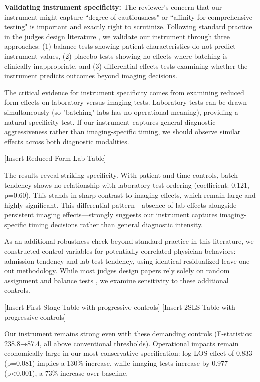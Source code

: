 \documentclass[11pt]{article}
\newcommand{\1}{\hbox{\rm 1\kern-.35em 1}}
\begin{document}
{\textbf{Validating instrument specificity:} The reviewer's concern that our instrument might capture ``degree of cautiousness" or ``affinity for comprehensive testing" is important and exactly right to scrutinize. Following standard practice in the judges design literature \cite{dobbie2018effects, bhuller2020incarceration}, we validate our instrument through three approaches: (1) balance tests showing patient characteristics do not predict instrument values, (2) placebo tests showing no effects where batching is clinically inappropriate, and (3) differential effects tests examining whether the instrument predicts outcomes beyond imaging decisions.

The critical evidence for instrument specificity comes from examining reduced form effects on laboratory versus imaging tests. Laboratory tests can be drawn simultaneously (so "batching" labs has no operational meaning), providing a natural specificity test. If our instrument captures general diagnostic aggressiveness rather than imaging-specific timing, we should observe similar effects across both diagnostic modalities.

[Insert Reduced Form Lab Table]

The results reveal striking specificity. With patient and time controls, batch tendency shows no relationship with laboratory test ordering (coefficient: 0.121, p=0.60). This stands in sharp contrast to imaging effects, which remain large and highly significant. This differential pattern—absence of lab effects alongside persistent imaging effects—strongly suggests our instrument captures imaging-specific timing decisions rather than general diagnostic intensity.

As an additional robustness check beyond standard practice in this literature, we constructed control variables for potentially correlated physician behaviors: admission tendency and lab test tendency, using identical residualized leave-one-out methodology. While most judges design papers rely solely on random assignment and balance tests \cite{dobbie2018effects, AizerDoyle2015}, we examine sensitivity to these additional controls.

[Insert First-Stage Table with progressive controls]
[Insert 2SLS Table with progressive controls]

Our instrument remains strong even with these demanding controls (F-statistics: 238.8→87.4, all above conventional thresholds). Operational impacts remain economically large in our most conservative specification: log LOS effect of 0.833 (p=0.081) implies a 130\% increase, while imaging tests increase by 0.977 (p<0.001), a 73\% increase over baseline.

}
\end{document}
